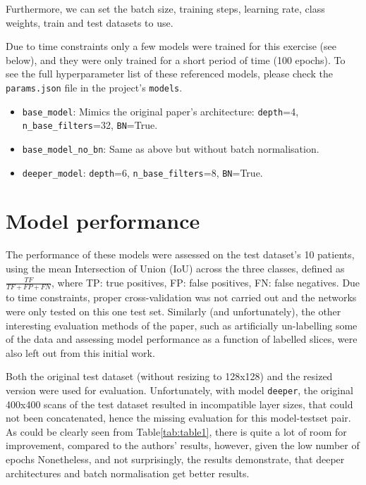 \documentclass{article}
\begin{document}
Furthermore, we can set the batch size, training steps, learning rate, class weights, train and test datasets to use. 

Due to time constraints only a few models were trained for this exercise (see below), and they were only trained for a short period of time (100 epochs). To see the full hyperparameter list of these referenced models, please check the \texttt{params.json} file in the project's \texttt{models}. 

\begin{itemize}
	\item \texttt{base\_model}: Mimics the original paper's architecture: \texttt{depth}=4, \texttt{n\_base\_filters}=32, \texttt{BN}=True.
	\item \texttt{base\_model\_no\_bn}: Same as above but without batch normalisation. 
	\item \texttt{deeper\_model}: \texttt{depth}=6, \texttt{n\_base\_filters}=8, \texttt{BN}=True.
\end{itemize}



\section{Model performance}

The performance of these models were assessed on the test dataset's 10 patients, using the mean Intersection of Union (IoU) across the three classes, defined as $\frac{TF}{TF + FP + FN}$, where TP: true positives, FP: false positives, FN: false negatives. Due to  time constraints, proper cross-validation was not carried out and the networks were only tested on this one test set. Similarly (and unfortunately), the other interesting evaluation methods of the paper, such as artificially un-labelling some of the data and assessing model performance as a function of labelled slices, were also left out from this initial work.

Both the original test dataset (without resizing to 128x128) and the resized version were used for evaluation. Unfortunately, with model \texttt{deeper}, the original 400x400 scans of the test dataset resulted in incompatible layer sizes, that could not been concatenated, hence the missing evaluation for this model-testset pair. As could be clearly seen from Table\ref{tab:table1}, there is quite a lot of room for improvement, compared to the authors' results, however, given the low number of epochs  Nonetheless, and not surprisingly, the results demonstrate, that deeper architectures and batch normalisation get better results.
\end{document}

